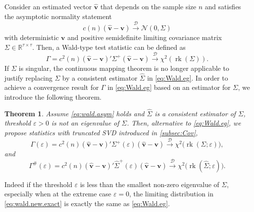 \documentclass[12pt]{article}
\numberwithin{equation}{section}
\numberwithin{table}{section}
\newtheorem{thm}{Theorem}
\numberwithin{thm}{section}
\numberwithin{defn}{section}
\numberwithin{lem}{section}
\numberwithin{prop}{section}
\numberwithin{cor}{section}
\numberwithin{rem}{section}
\newcommand{\rank}{\operatorname{rk}}
\begin{document}
\begin{appendix}
Consider an estimated vector $\widehat{\bm{v}}$ that depends on the sample size $n$ and satisfies the asymptotic normality statement 
\begin{equation}\label{eq:wald.asym}
    c(n) (\widehat{\bm{v}} - \bm{v}) \xrightarrow{\mathcal{D}} \mathcal{N}(0, \Sigma)
\end{equation}
with deterministic $\bm{v}$ and positive semidefinite limiting covariance matrix $\Sigma \in \mathbb{R}^{\tau \times \tau}$. Then, a Wald-type test statistic can be defined as
\begin{equation}\label{eq:Wald.eg}
    \Gamma = c^2(n) (\widehat{\bm{v}} - \bm{v})' \Sigma^+ (\widehat{\bm{v}} - \bm{v}) \xrightarrow{\mathcal{D}} \chi^2(\rank(\Sigma)).
\end{equation}
If $\Sigma$ is singular, the continuous mapping theorem is no longer applicable to justify replacing $\Sigma$ by a consistent estimator $\widehat{\Sigma}$ in \eqref{eq:Wald.eg}. In order to achieve a convergence result for $\Gamma$ in \eqref{eq:Wald.eg} based on an estimator for $\Sigma$, we introduce the following theorem.

\begin{thm}\label{thm:generalwald}
Assume \eqref{eq:wald.asym} holds and $\widehat{\Sigma}$ is a consistent estimator of $\Sigma$, threshold $\varepsilon > 0$ is not an eigenvalue of $\Sigma$. Then, alternative to \eqref{eq:Wald.eg}, we propose statistics with truncated SVD introduced in \autoref{subsec:Cov},
\begin{equation}\label{eq:wald.new.exact}
    \Gamma(\varepsilon) = c^2(n) (\widehat{\bm{v}} - \bm{v})' \Sigma^+(\varepsilon) (\widehat{\bm{v}} - \bm{v}) \xrightarrow{\mathcal{D}} \chi^2\big(\rank(\Sigma; \varepsilon)\big),
\end{equation}
and
\begin{equation}\label{eq:wald.new.est}
    \Gamma^\#(\varepsilon) = c^2(n) (\widehat{\bm{v}} - \bm{v})' \widehat{\Sigma}^+(\varepsilon) (\widehat{\bm{v}} - \bm{v}) \xrightarrow{\mathcal{D}} \chi^2\big(\rank(\widehat{\Sigma}; \varepsilon)\big).
\end{equation}
\end{thm}

Indeed if the threshold $\varepsilon$ is less than the smallest non-zero eigenvalue of $\Sigma$, especially when at the extreme case $\varepsilon = 0$, the limiting distribution in \eqref{eq:wald.new.exact} is exactly the same as \eqref{eq:Wald.eg}.


\end{appendix}
\end{document}
